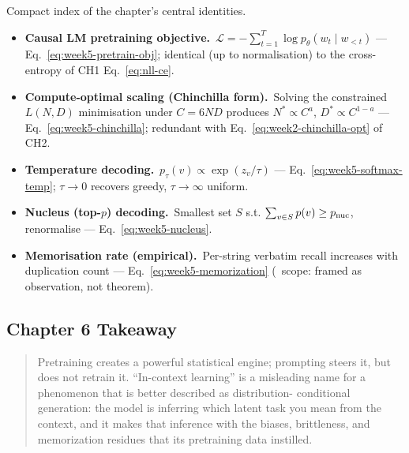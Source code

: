 \begin{derivledger}
Compact index of the chapter's central identities.
\begin{itemize}
  \item \textbf{Causal LM pretraining objective.}\
        $\mathcal{L} = -\sum_{t=1}^{T} \log p_\theta(w_t \mid w_{<t})$
        --- Eq.~\eqref{eq:week5-pretrain-obj}; identical (up to
        normalisation) to the cross-entropy of CH1
        Eq.~\eqref{eq:nll-ce}.
  \item \textbf{Compute-optimal scaling (Chinchilla form).}\
        Solving the constrained $L(N, D)$ minimisation under
        $C = 6ND$ produces $N^* \propto C^a$, $D^* \propto C^{1-a}$
        --- Eq.~\eqref{eq:week5-chinchilla}; redundant with
        Eq.~\eqref{eq:week2-chinchilla-opt} of CH2.
  \item \textbf{Temperature decoding.}\
        $p_\tau(v) \propto \exp(z_v / \tau)$
        --- Eq.~\eqref{eq:week5-softmax-temp};
        $\tau \to 0$ recovers greedy, $\tau \to \infty$ uniform.
  \item \textbf{Nucleus (top-$p$) decoding.}\
        Smallest set $S$ s.t. $\sum_{v \in S} p(v) \ge p_{\rm nuc}$,
        renormalise --- Eq.~\eqref{eq:week5-nucleus}.
  \item \textbf{Memorisation rate (empirical).}\
        Per-string verbatim recall increases with duplication count
        --- Eq.~\eqref{eq:week5-memorization} (\Emp\ scope: framed
        as observation, not theorem).
\end{itemize}
\end{derivledger}

\subsection{Chapter 6 Takeaway}

\begin{quote}
Pretraining creates a powerful statistical engine; prompting steers
it, but does not retrain it. ``In-context learning'' is a misleading
name for a phenomenon that is better described as distribution-
conditional generation: the model is inferring which latent task you
mean from the context, and it makes that inference with the
biases, brittleness, and memorization residues that its pretraining
data instilled.
\end{quote}
